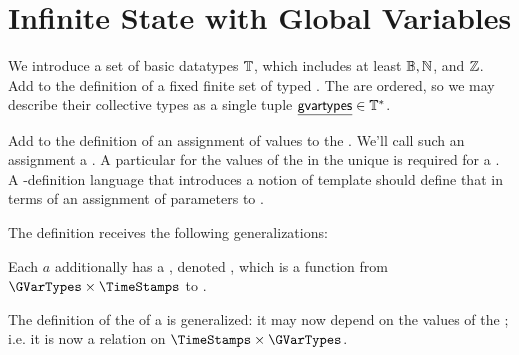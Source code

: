 \documentclass[12pt]{article}
\begin{document}
\section{Infinite State with Global Variables} \label{globalvars}
\medskip




We introduce a set of basic datatypes $\mathbb{T}$, which includes at least $\mathbb{B}, \mathbb{N}$, and $\mathbb{Z}$. Add to the definition of \Contract a fixed finite set of typed . The \GVars are ordered, so we may describe their collective types as a single tuple $\underline{{\sf gvartypes}} \in \mathbb{T}^* $.

Add to the definition of \GlobalState an assignment of values to the \GVars. We'll call such an assignment a . A particular \gvarsassign {} for the values of the \GVars in the unique \startstate is required for a \Contract. A \Contract-definition language that introduces a notion of \Contract template should define that in terms of an assignment of parameters to \initvals.



 The \Event definition receives the following generalizations:
\begin{LPPI}
\item Each \Action $a$ additionally has a \gvTransform, denoted , which is a function from
$\GVarTypes \times \TimeStamps$ to \GVarTypes.
\item The definition of the \TGuard of a  is generalized: it may now depend on the values of the \GVars; i.e. it is now a relation on $\TimeStamps \times \GVarTypes$.
\end{LPPI}
\end{document}
